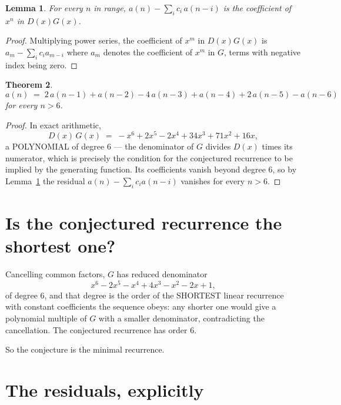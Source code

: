 \documentclass[11pt,a4paper]{article}
\theoremstyle{plain}
\newtheorem{theorem}{Theorem}
\newtheorem{lemma}[theorem]{Lemma}
\theoremstyle{definition}
\begin{document}
\begin{lemma}\label{lem:key}
For every $n$ in range, $a(n)-\sum_i c_i\,a(n-i)$ is the coefficient of $x^{n}$ in
$D(x)G(x)$.
\end{lemma}

\begin{proof}
Multiplying power series, the coefficient of $x^{m}$ in $D(x)G(x)$ is
$a_m-\sum_i c_i a_{m-i}$ where $a_m$ denotes the coefficient of $x^{m}$ in $G$, terms with
negative index being zero.
\end{proof}

\begin{theorem}
\[
a(n)\;=\;2\,a(n-1) + a(n-2) - 4\,a(n-3) + a(n-4) + 2\,a(n-5) - a(n-6)
\]
for every $n>6$.
\end{theorem}

\begin{proof}
In exact arithmetic,
\[
D(x)\,G(x)\;=\;- x^{6} + 2 x^{5} - 2 x^{4} + 34 x^{3} + 71 x^{2} + 16 x,
\]
a POLYNOMIAL of degree $6$ --- the denominator of $G$ divides $D(x)$ times its numerator,
which is precisely the condition for the conjectured recurrence to be implied by the
generating function. Its coefficients vanish beyond degree $6$, so by
Lemma~\ref{lem:key} the residual $a(n)-\sum_ic_ia(n-i)$ vanishes for every
$n>6$.
\end{proof}

\section{Is the conjectured recurrence the shortest one?}

Cancelling common factors, $G$ has reduced denominator
\[
x^{6} - 2 x^{5} - x^{4} + 4 x^{3} - x^{2} - 2 x + 1,
\]
of degree $6$, and that degree is the order of the SHORTEST linear recurrence with
constant coefficients the sequence obeys: any shorter one would give a polynomial multiple of
$G$ with a smaller denominator, contradicting the cancellation. The conjectured recurrence has
order $6$.

So the conjecture is the minimal recurrence.

\section{The residuals, explicitly}
\end{document}
